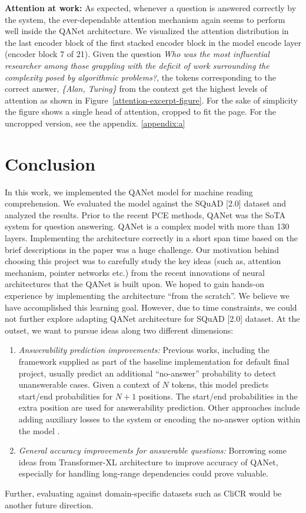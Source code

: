 \documentclass{article}
\begin{document}
\textbf{Attention at work:} As expected, whenever a question is answered correctly by the system, the ever-dependable attention mechanism again seems to perform well inside the QANet architecture. We visualized the attention distribution in the last encoder block of the first stacked encoder block in the model encode layer (encoder block 7 of 21). Given the question \textit{Who was the most influential researcher among those grappling with the deficit of work surrounding the complexity posed by algorithmic problems?}, the tokens corresponding to the correct answer, \textit{\{Alan, Turing\}} from the context get the highest levels of attention as shown in Figure~\ref{attention-excerpt-figure}. For the sake of simplicity the figure shows a single head of attention, cropped to fit the page. For the uncropped version, see the appendix. \ref{appendix:a}


\section{Conclusion}
In this work, we implemented the QANet model for machine reading comprehension. We evaluated the model against the SQuAD [2.0] dataset and analyzed the results.  Prior to the recent PCE methods, QANet was the SoTA system for question answering. QANet is a complex model with more than 130 layers. Implementing the architecture correctly in a short span time based on the brief descriptions in the paper was a huge challenge. Our motivation behind choosing this project was to carefully study the key ideas (such as, attention mechanism, pointer networks etc.) from the recent innovations of neural architectures that the QANet is built upon. We hoped to gain hands-on experience by implementing the architecture “from the scratch”. We believe we have accomplished this learning goal. However, due to time constraints, we could not further explore adapting QANet architecture for SQuAD [2.0] dataset.  At the outset, we want to pursue ideas along two different dimensions:
\begin{enumerate}
  \item \textit{Answerability prediction improvements:} Previous works, including the framework supplied as part of the baseline implementation for default final project, usually predict an additional “no-answer” probability to detect unanswerable cases. Given a context of $N$ tokens, this model predicts start/end probabilities for $N+1$ positions. The start/end probabilities in the extra position are used for answerability prediction. Other approaches include adding auxiliary losses to the system \cite{hu2018read+} or encoding the no-answer option within the model \cite{clark2017simple}.
  \item \textit{General accuracy improvements for answerable questions:} Borrowing some ideas from Transformer-XL architecture \cite{dai2019transformerxl} to improve accuracy of QANet, especially for handling long-range dependencies could prove valuable. 
\end{enumerate}	
Further, evaluating against domain-specific datasets such as CliCR \cite{vsuster2018clicr} would be another future direction. 
\end{document}
